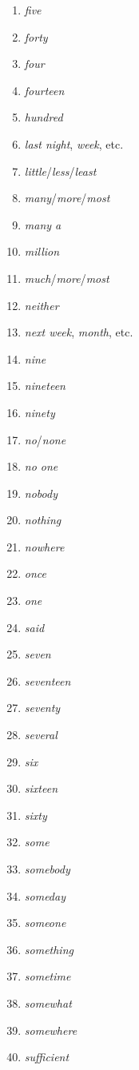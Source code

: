 \begin{multicols}{3}
\begin{enumerate}[noitemsep]
\item\textit{five}
\item\textit{forty}
\item\textit{four}
\item\textit{fourteen}
\item\textit{hundred}
\item\textit{last \op night}, \textit{week}, etc.\cp
\item\textit{little}/\textit{less}/\textit{least}
\item\textit{many}/\textit{more}/\textit{most}
\item\textit{many a}
\item\textit{million}
\item\textit{much}/\textit{more}/\textit{most}
\item\textit{neither}
\item\textit{next \op week}, \textit{month}, etc.\cp
\item\textit{nine}
\item\textit{nineteen}
\item\textit{ninety}
\item\textit{no}/\textit{none}
\item\textit{no one}
\item\textit{nobody}
\item\textit{nothing}
\item\textit{nowhere}
\item\textit{once}
\item\textit{one}
\item\textit{said}
\item\textit{seven}
\item\textit{seventeen}
\item\textit{seventy}
\item\textit{several}
\item\textit{six}
\item\textit{sixteen}
\item\textit{sixty}
\item\textit{some}
\item\textit{somebody}
\item\textit{someday}
\item\textit{someone}
\item\textit{something}
\item\textit{sometime}
\item\textit{somewhat}
\item\textit{somewhere}
\item\textit{sufficient}

\end{enumerate}
\end{multicols}
